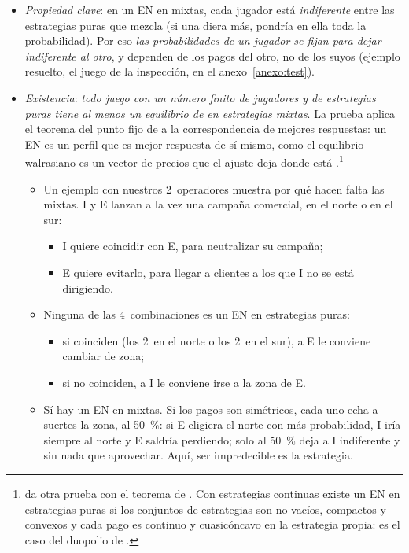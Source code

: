 \documentclass[11pt]{article}
\begin{document}
\begin{itemize}
  \begin{itemize}
  \item \emph{Propiedad clave}: en un EN en mixtas, cada jugador está \emph{indiferente} entre las estrategias puras que mezcla (si una diera más, pondría en ella toda la probabilidad). Por eso \emph{las probabilidades de un jugador se fijan para dejar indiferente al otro}, y dependen de los pagos del otro, no de los suyos (ejemplo resuelto, el juego de la inspección, en el anexo~\ref{anexo:test}).
  \item \emph{Existencia}\nocite{Nash1950Equilibrium}: \emph{todo juego con un número finito de jugadores y de estrategias puras tiene al menos un equilibrio de  en estrategias mixtas}. La prueba aplica el teorema del punto fijo de \textcite{Kakutani1941Generalization} a la correspondencia de mejores respuestas: un EN es un perfil que es mejor respuesta de sí mismo, como el equilibrio walrasiano es un vector de precios que el ajuste deja donde está .\footnote{\textcite{Nash1951NonCooperative} da otra prueba con el teorema de . Con estrategias continuas existe un EN en estrategias puras si los conjuntos de estrategias son no vacíos, compactos y convexos y cada pago es continuo y cuasicóncavo en la estrategia propia\nocite{MasColellWhinstonGreen1995}: es el caso del duopolio de .}
    \begin{itemize}
    \item Un ejemplo con nuestros 2~operadores muestra por qué hacen falta las mixtas. \textup{I} y E lanzan a la vez una campaña comercial, en el norte o en el sur:
      \begin{itemize}
      \item \textup{I} quiere coincidir con E, para neutralizar su campaña;
      \item E quiere evitarlo, para llegar a clientes a los que \textup{I} no se está dirigiendo.
      \end{itemize}
    \item Ninguna de las 4~combinaciones es un EN en estrategias puras:
      \begin{itemize}
      \item si coinciden (los 2~en el norte o los 2~en el sur), a E le conviene cambiar de zona;
      \item si no coinciden, a \textup{I} le conviene irse a la zona de E.
      \end{itemize}
    \item Sí hay un EN en mixtas. Si los pagos son simétricos, cada uno echa a suertes la zona, al 50~\%: si E eligiera el norte con más probabilidad, \textup{I} iría siempre al norte y E saldría perdiendo; solo al 50~\% deja a \textup{I} indiferente y sin nada que aprovechar. Aquí, ser impredecible es la estrategia.

\end{itemize}
\end{itemize}
\end{itemize}
\end{document}
